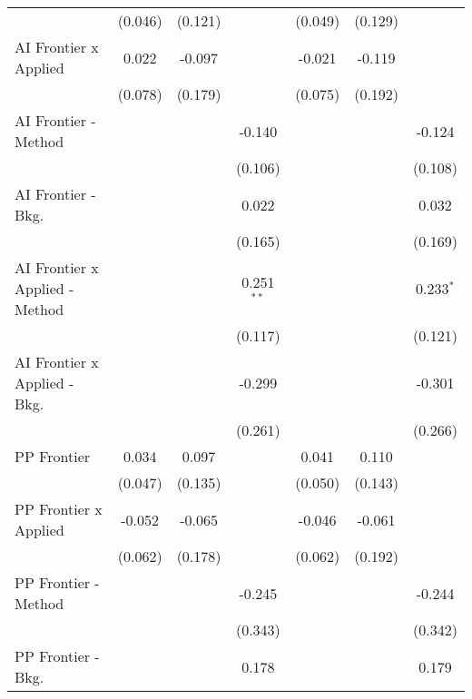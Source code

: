 \begin{tabular}{lcccccc}
                                  & (0.046) & (0.121)     &                & (0.049) & (0.129)     &   \\   
   AI Frontier x Applied          & 0.022   & -0.097      &                & -0.021  & -0.119      &   \\   
                                  & (0.078) & (0.179)     &                & (0.075) & (0.192)     &   \\   
   AI Frontier - Method           &         &             & -0.140         &         &             & -0.124\\   
                                  &         &             & (0.106)        &         &             & (0.108)\\   
   AI Frontier - Bkg.             &         &             & 0.022          &         &             & 0.032\\   
                                  &         &             & (0.165)        &         &             & (0.169)\\   
   AI Frontier x Applied - Method &         &             & 0.251$^{**}$   &         &             & 0.233$^{*}$\\   
                                  &         &             & (0.117)        &         &             & (0.121)\\   
   AI Frontier x Applied - Bkg.   &         &             & -0.299         &         &             & -0.301\\   
                                  &         &             & (0.261)        &         &             & (0.266)\\   
   PP Frontier                    & 0.034   & 0.097       &                & 0.041   & 0.110       &   \\   
                                  & (0.047) & (0.135)     &                & (0.050) & (0.143)     &   \\   
   PP Frontier x Applied          & -0.052  & -0.065      &                & -0.046  & -0.061      &   \\   
                                  & (0.062) & (0.178)     &                & (0.062) & (0.192)     &   \\   
   PP Frontier - Method           &         &             & -0.245         &         &             & -0.244\\   
                                  &         &             & (0.343)        &         &             & (0.342)\\   
   PP Frontier - Bkg.             &         &             & 0.178          &         &             & 0.179\\   

\end{tabular}
